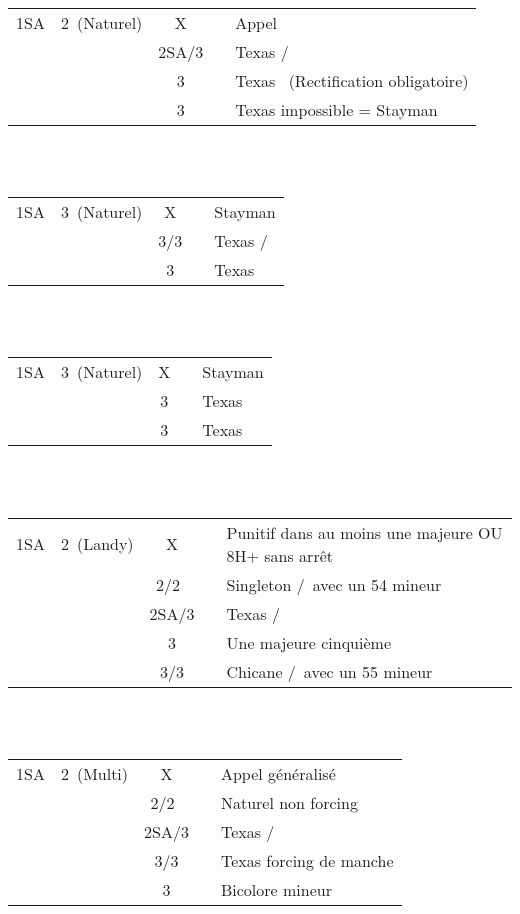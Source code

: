 \documentclass[a4paper, oneside, 11pt]{report}
\begin{document}
		\begin{tabular}{cccc|l}
		1SA & 2\pique\ (Naturel) & X && Appel\\
		&& 2SA/3\trefle && Texas \trefle/\carreau\\
		&& 3\carreau && Texas \coeur\ (Rectification obligatoire)\\
		&& 3\coeur && Texas impossible = Stayman\\
		\end{tabular}\\\\

		\begin{tabular}{cccc|l}
		1SA & 3\trefle\ (Naturel) & X && Stayman\\
		&& 3\carreau/3\coeur && Texas \coeur/\pique\\
		&& 3\pique && Texas \carreau\\
		\end{tabular}\\\\

		\begin{tabular}{cccc|l}
		1SA & 3\carreau\ (Naturel) & X && Stayman\\
		&& 3\coeur && Texas \pique\\
		&& 3\pique && Texas \coeur\\
		\end{tabular}\\\\

		\begin{tabular}{cccc|l}
		1SA & 2\trefle\ (Landy) & X && Punitif dans au moins une majeure OU 8H+ sans arrêt\\
		&& 2\coeur/2\pique\ && Singleton \coeur/\pique\ avec un 54 mineur\\
		&& 2SA/3\trefle && Texas \trefle/\carreau\\
		&& 3\carreau && Une majeure cinquième\\
		&& 3\coeur/3\pique && Chicane \pique/\coeur\ avec un 55 mineur\\
		\end{tabular}\\\\

		\begin{tabular}{cccc|l}
		1SA & 2\carreau\ (Multi) & X && Appel généralisé\\
		&& 2\coeur/2\pique\ && Naturel non forcing\\
		&& 2SA/3\trefle && Texas \trefle/\carreau\\
		&& 3\carreau/3\coeur && Texas forcing de manche\\
		&& 3\pique && Bicolore mineur\\
		\end{tabular}\\\\
\end{document}

